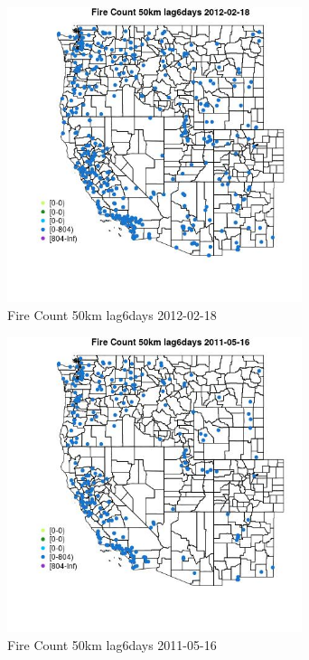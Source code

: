 \begin{figure} 
\centering  
\includegraphics[width=0.77\textwidth]{Code_Outputs/Report_ML_input_PM25_Step4_part_f_de_duplicated_aveswNAs_MapObsFire_Count_50km_lag6days2012-02-18.jpg} 
\caption{\label{fig:Report_ML_input_PM25_Step4_part_f_de_duplicated_aveswNAsMapObsFire_Count_50km_lag6days2012-02-18}Fire Count 50km lag6days 2012-02-18} 
\end{figure} 
 

\clearpage 

\begin{figure} 
\centering  
\includegraphics[width=0.77\textwidth]{Code_Outputs/Report_ML_input_PM25_Step4_part_f_de_duplicated_aveswNAs_MapObsFire_Count_50km_lag6days2011-05-16.jpg} 
\caption{\label{fig:Report_ML_input_PM25_Step4_part_f_de_duplicated_aveswNAsMapObsFire_Count_50km_lag6days2011-05-16}Fire Count 50km lag6days 2011-05-16} 
\end{figure} 
 

